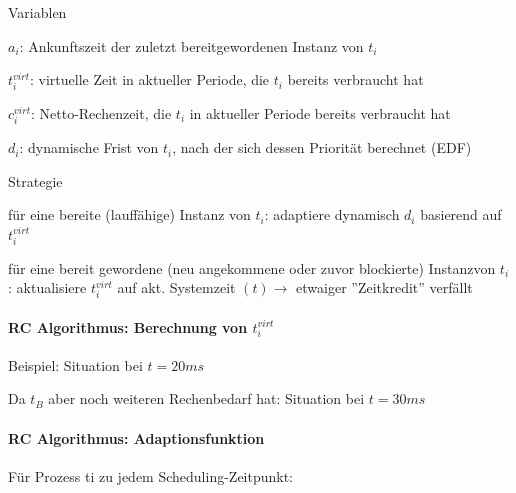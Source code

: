 \documentclass[a4paper]{article}
\begin{document}
\begin{multicols}{3}
    \begin{itemize*}
        \item
        Variablen
        \begin{itemize*}
            \item $a_i$: Ankunftszeit der zuletzt bereitgewordenen Instanz von $t_i$
            \item $t_i^{virt}$: virtuelle Zeit in aktueller Periode, die $t_i$ bereits verbraucht hat
            \item $c_i^{virt}$: Netto-Rechenzeit, die $t_i$ in aktueller Periode bereits verbraucht hat
            \item $d_i$: dynamische Frist von $t_i$, nach der sich dessen Priorität berechnet (EDF)
        \end{itemize*}
        \item
        Strategie
        \begin{itemize*}
            \item für eine bereite (lauffähige) Instanz von $t_i$: adaptiere dynamisch $d_i$ basierend auf $t_i^{virt}$
            \item für eine bereit gewordene (neu angekommene oder zuvor blockierte) Instanzvon $t_i$: aktualisiere $t_i^{virt}$ auf akt. Systemzeit $(t)\rightarrow$ etwaiger ''Zeitkredit'' verfällt
        \end{itemize*}
    \end{itemize*}


    \paragraph{RC Algorithmus: Berechnung von $t_i^{virt}$}

    Beispiel: Situation bei $t=20ms$

    Da $t_B$ aber noch weiteren Rechenbedarf hat: Situation bei $t=30
        ms$


    \paragraph{RC Algorithmus:
        Adaptionsfunktion}

    Für Prozess ti zu jedem Scheduling-Zeitpunkt:


\end{multicols}
\end{document}
